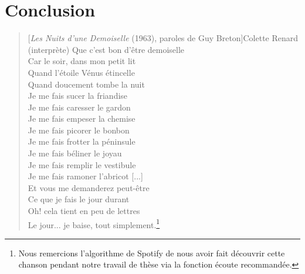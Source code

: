 \chapter*{Conclusion}

\begin{quote}[\textit{Les Nuits d'une Demoiselle} (1963), paroles de Guy Breton]{Colette Renard (interprète)}
Que c'est bon d'être demoiselle \\
Car le soir, dans mon petit lit \\
Quand l'étoile Vénus étincelle \\
Quand doucement tombe la nuit \\  
Je me fais sucer la friandise \\
Je me fais caresser le gardon \\
Je me fais empeser la chemise \\
Je me fais picorer le bonbon \\
Je me fais frotter la péninsule \\
Je me fais béliner le joyau \\
Je me fais remplir le vestibule \\
Je me fais ramoner l'abricot {[...]} \\
Et vous me demanderez peut-être \\
Ce que je fais le jour durant \\
Oh! cela tient en peu de lettres \\
Le jour... je baise, tout simplement.\footnote{Nous remercions l'algorithme de Spotify de nous avoir fait découvrir cette chanson pendant notre travail de thèse via la fonction écoute recommandée.}
\end{quote}

